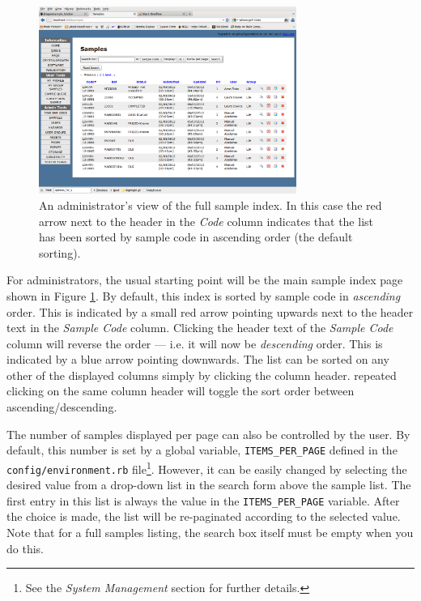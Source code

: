 \documentclass[12pt,twoside]{article}
\begin{document}
\begin{figure}[!h]
\begin{center}
\includegraphics[width=0.75\textwidth]{sampleindex}
\caption{An administrator's view of the full sample index. 
In this case the red arrow next to the header in the \emph{Code}
column indicates that the list has been sorted by sample code in
ascending order (the default sorting).\label{fig:sampleindex}}
\end{center}
\end{figure}

For administrators, the usual starting point will be the main sample
index page shown in Figure \ref{fig:sampleindex}.
By default, this index is sorted by sample code in \emph{ascending} order.
This is indicated by a small red arrow pointing upwards next to the header
text in the \emph{Sample Code} column. 
Clicking the header text of the \emph{Sample Code} column will reverse the
order --- i.e. it will now be \emph{descending} order. This is indicated
by a blue arrow pointing downwards.
The list can be sorted on any other of the displayed columns simply by
clicking the column header. repeated clicking on the same column header
will toggle the sort order between ascending/descending.

The number of samples displayed per page can also be controlled by the
user. By default, this number is set by a global variable,
\verb=ITEMS_PER_PAGE= defined in the \verb=config/environment.rb= file\footnote{See the \emph{System Management} section for further details.}.
However, it can be easily changed by selecting the desired value from
a drop-down list in the search form above the sample list.
The first entry in this list is always the value in the
\verb=ITEMS_PER_PAGE= variable.
After the choice is made, the list will be re-paginated according to
the selected value. Note that for a full samples listing, the search box
itself must be empty when you do this.
\end{document}

